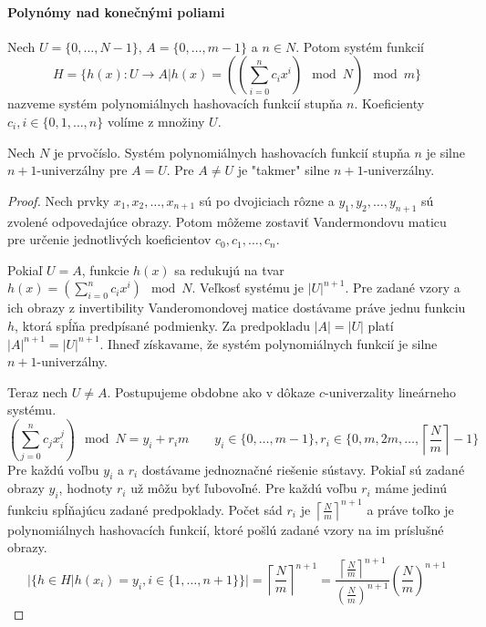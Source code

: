 \paragraph{Polynómy nad konečnými poliami}
\begin{definition}
Nech $U = \{0, \dots, N - 1 \}$, $A = \{0, \dots, m - 1\}$ a $n \in N$. Potom systém funkcií 
\[ H = \{h(x): U \rightarrow A | h(x) = ((\displaystyle \sum_{i=0}^{n} c_i x^i ) \mod N) \mod m\} \]
nazveme systém polynomiálnych hashovacích funkcií stupňa $n$. Koeficienty $c_i, i \in \{0, 1, \dots, n\}$ volíme z množiny $U$.
\end{definition}
\begin{remark}
Nech $N$ je prvočíslo. Systém polynomiálnych hashovacích funkcií stupňa $n$ je silne $n + 1$-univerzálny pre $A = U$. Pre $A \neq U$ je "takmer" silne $n + 1$-univerzálny.
\end{remark}
\begin{proof}
Nech prvky $x_1, x_2, \dots, x_{n+1}$ sú po dvojiciach rôzne a $y_1, y_2, \dots, y_{n+1}$ sú zvolené odpovedajúce obrazy. Potom môžeme zostaviť Vandermondovu maticu pre určenie jednotlivých koeficientov $c_0, c_1, \dots, c_n$.

Pokiaľ $U = A$, funkcie $h(x)$ sa redukujú na tvar $h(x) = (\displaystyle \sum_{i=0}^{n} c_i x^i ) \mod N$. Veľkosť systému je ${|U|}^{n+1}$. Pre zadané vzory a ich obrazy z invertibility Vanderomondovej matice dostávame práve jednu funkciu $h$, ktorá spĺňa predpísané podmienky. Za predpokladu $|A| = |U|$ platí ${|A|}^{n+1} = {|U|}^{n+1}$. Ihneď získavame, že systém polynomiálnych funkcií je silne $n+1$-univerzálny.

Teraz nech $U \neq A$. Postupujeme obdobne ako v dôkaze $c$-univerzality lineárneho systému.
\begin{displaymath}
(\displaystyle \sum_{j=0}^{n} c_j x_{i}^{j} ) \mod N = {y}_i + {r_i}{m} \qquad {y}_i \in \{0, \dots, m - 1 \}, r_i \in \{0, m, 2m, \dots, \left\lceil \frac{N}{m} \right\rceil - 1\}
\end{displaymath}
Pre každú voľbu ${y}_i$ a $r_i$ dostávame jednoznačné riešenie sústavy. Pokiaľ sú zadané obrazy $y_i$, hodnoty $r_i$ už môžu byť ľubovoľné. Pre každú voľbu $r_i$ máme jedinú funkciu spĺňajúcu zadané predpoklady. Počet sád $r_i$ je ${\left\lceil \frac{N}{m} \right\rceil}^{n + 1}$ a práve toľko je polynomiálnych hashovacích funkcií, ktoré pošlú zadané vzory na im príslušné obrazy.
\begin{displaymath}
|\{h \in H | h(x_i) = y_i, i \in \{1, \dots, n + 1\}\}| = {\left\lceil \frac{N}{m} \right\rceil}^{n + 1} = \frac{{\left\lceil \frac{N}{m} \right\rceil}^{n + 1}}{(\frac{N}{m})^{n+1}}\left(\frac{N}{m}\right)^{n+1}
\end{displaymath}
\end{proof}


